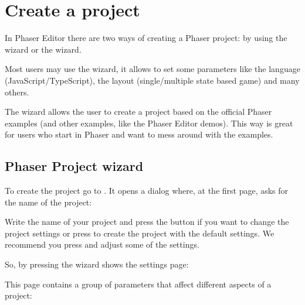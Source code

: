 \documentclass[letterpaper,10pt,english]{sphinxmanual}
\begin{document}


\section{Create a project}
\label{\detokenize{first_steps:create-a-project}}
In Phaser Editor there are two ways of creating a Phaser project: by using the  wizard or the  wizard.

Most users may use the  wizard, it allows to set some parameters like the language (JavaScript/TypeScript), the layout (single/multiple state based game) and many others.

The  wizard allows the user to create a project based on the official Phaser examples (and other examples, like the Phaser Editor demos). This way is great for users who start in Phaser and want to mess around with the examples.


\subsection{Phaser Project wizard}
\label{\detokenize{first_steps:phaser-project-wizard}}
To create the project go to . It opens a dialog where, at the first page, asks for the name of the project:
\begin{quote}

\noindent{}
\end{quote}

Write the name of your project and press the  button if you want to change the project settings or press  to create the project with the default settings. We recommend you press  and adjust some of the settings.

So, by pressing  the wizard shows the settings page:

\noindent{}

This page contains a group of parameters that affect different aspects of a project:
\end{document}
